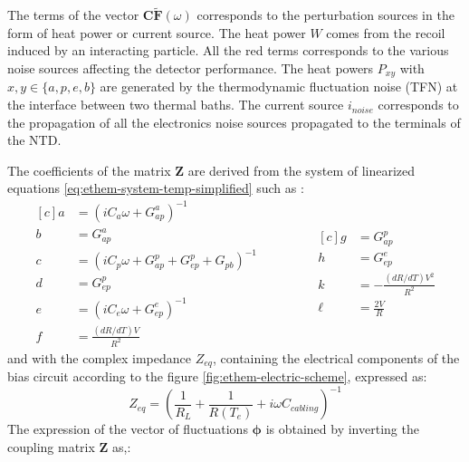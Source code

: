 The terms of the vector $\bm{C} \bm{\tilde{F}} (\omega)$ corresponds to the perturbation sources in the form of heat power or current source. The heat power $W$ comes from the recoil induced by an interacting particle.
All the red terms corresponds to the various noise sources affecting the detector performance. The heat powers $P_{xy}$ with $x,y \in \{ a,p,e,b \}$ are generated by the thermodynamic fluctuation noise (TFN) at the interface between two thermal baths. The current source $i_{noise}$ corresponds to the propagation of all the electronics noise sources propagated to the terminals of the NTD.

The coefficients of the matrix $\bm{Z}$ are derived from the system of linearized equations \ref{eq:ethem-system-temp-simplified} such as :
\begin{equation}
\begin{aligned}[c]
a &=(i C_a \omega + G_{ap}^a)^{-1} \\
b &=G_{ap}^a \\
c &=(i C_p \omega + G_{ap}^p + G_{ep}^p + G_{pb})^{-1} \\
d &=G_{ep}^p \\
e &=(i C_e \omega + G_{ep}^e)^{-1}\\
f &=\frac{(dR/dT) V}{R^2} 
\end{aligned}
\qquad \qquad
\begin{aligned}[c]
g &=G_{ap}^p \\
h &=G_{ep}^e \\
k &=- \frac{(dR/dT) V^{2}}{R^{2}} \\
\ell &=\frac{2 V}{R}
\end{aligned}
\label{coef}
\end{equation}
and with the complex impedance $Z_{eq}$, containing the electrical components of the bias circuit according to the figure \ref{fig:ethem-electric-scheme}, expressed as:
\begin{equation}
Z_{eq} = \left(\frac{1}{R_L} + \frac{1}{R(T_e)} + i\omega C_{cabling}\right)^{-1}
\end{equation}
The expression of the vector of fluctuations $\bm{\phi}$ is obtained by inverting the coupling matrix $\bm{Z}$ as,:
